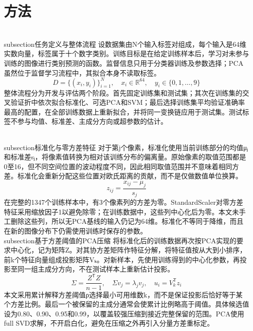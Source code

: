 \documentclass[supercite]{HustGSClassPaper}
\begin{document}
\section{方法}
\\subsection{任务定义与整体流程}
设数据集由N个输入标签对组成，每个输入是64维实数向量，标签属于十个数字类别。训练目标是在给定训练样本后，学习对未参与训练的图像进行类别预测的函数。监督信息只用于分类器训练及参数选择；PCA虽然位于监督学习流程中，其拟合本身不读取标签。
\begin{equation}
D = \{(x_i,y_i)\}_{i=1}^{N},\quad x_i\in\mathbb{R}^{64},\quad y_i\in\{0,1,\ldots,9\}
\end{equation}
整体流程分为开发与评估两个阶段。首先固定训练集和测试集；其次在训练集的交叉验证折中依次拟合标准化、可选PCA和SVM；最后选择训练集平均验证准确率最高的配置，在全部训练数据上重新拟合，并将同一变换链应用于测试集。测试标签不参与均值、标准差、主成分方向或超参数的估计。
\begin{center}\end{center}
\\subsection{标准化与零方差特征}
对于第j个像素，标准化使用当前训练部分的均值μⱼ和标准差sⱼ，将像素值转换为相对该训练分布的偏离量。原始像素的取值范围都是0至16，但不同空间位置的波动程度不同，因此相同取值范围并不意味着相同方差。标准化会重新分配这些位置对欧氏距离的贡献，而不是仅做数值单位换算。
\begin{equation}
z_{ij}=\frac{x_{ij}-\mu_j}{s_j}
\end{equation}
在完整的1347个训练样本中，有3个像素列的方差为零。StandardScaler对零方差特征采用缩放因子1以避免除零；在训练数据中，这些列中心化后为零。本文未手工删除这些列，所以无PCA基线的输入仍记为64维。标准化不等同于降维，而且在新的图像分布下仍需使用训练时保存的参数。
\\subsection{基于方差阈值的PCA压缩}
将标准化后的训练数据再次按PCA实现的要求中心化，记为矩阵Z。对其协方差矩阵作特征分解，将特征值按从大到小排序，前k个特征向量组成投影矩阵Vₖ。对新样本，先使用训练得到的中心化参数，再投影至同一组主成分方向，不在测试样本上重新估计投影。
\begin{equation}
\Sigma=\frac{Z^\mathsf{T}Z}{n-1},\quad \Sigma v_j=\lambda_jv_j,\quad u_i=V_k^\mathsf{T}z_i
\end{equation}
本文采用累计解释方差阈值ρ选择最小可用维数k，而不是保证投影后恰好等于某个方差比例。最后一个被保留的主成分通常会使累计比例略高于阈值。具体候选值设为0.80、0.90、0.95和0.99，以覆盖较强压缩到接近完整保留的范围。PCA使用full SVD求解，不开启白化，避免在压缩之外再引入分量方差重标定。
\end{document}
